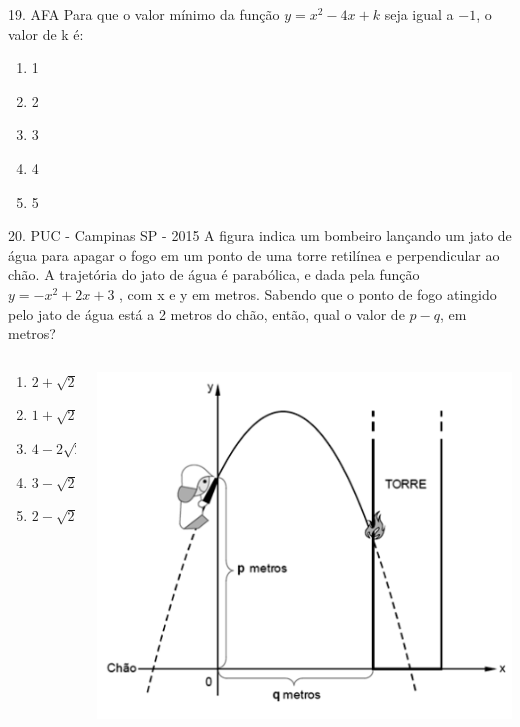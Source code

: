 \documentclass[11pt]{beamer}
\begin{document}
\begin{frame}{19. AFA}
    Para que o valor mínimo da função $y=x^{2}-4x+k$ seja igual a $-1$, o valor de k é:

    \begin{enumerate}[a]
        \item 1
        \item 2
        \item 3 %
        \item 4
        \item 5
    \end{enumerate}
\end{frame}

\begin{frame}{20. PUC - Campinas SP - 2015}
    A figura indica um bombeiro lançando um jato de água para apagar o fogo em um ponto de uma torre retilínea e perpendicular ao chão. A trajetória do jato de água é parabólica, e dada pela função $y = -x^{2} + 2x + 3$ , com x e y em metros. Sabendo que o ponto de fogo atingido pelo jato de água está a 2 metros do chão, então, qual o valor de $p-q$, em metros?

    \begin{columns}
        \begin{column}{0.4\textwidth}
            \begin{enumerate}[a]
                \item $2+\sqrt{2}$ 
                \item $1+\sqrt{2}$  
                \item $4-2\sqrt{2}$
                \item $3-\sqrt{2}$ 
                \item $2-\sqrt{2}$ %
            \end{enumerate}
        \end{column}

        \begin{column}{0.6\textwidth}
            \centering
            \includegraphics[width=0.75\linewidth]{imagens/q20.png}
        \end{column}
    \end{columns}
\end{frame}
\end{document}
